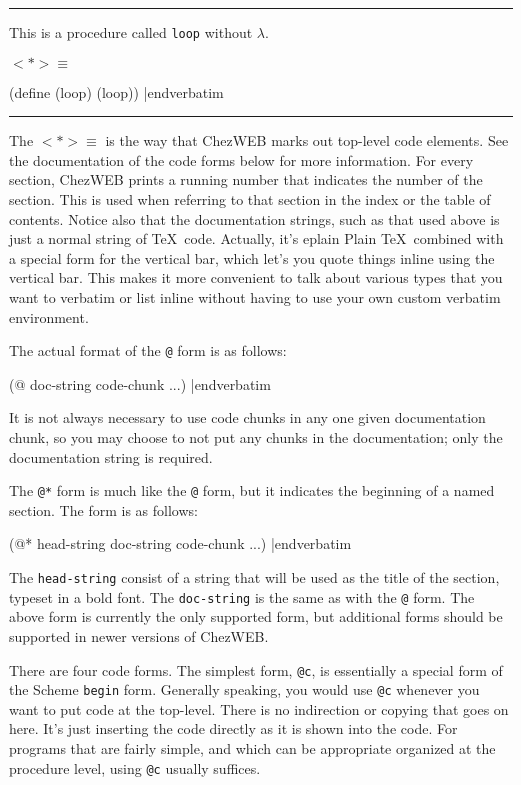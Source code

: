 \bigskip\hrule\smallskip
{\narrower {} This is a procedure called {\tt loop}
without $\lambda$.\par
\noindent $<*>\equiv$\par
\verbatim
(define (loop)
  (loop))
|endverbatim
\smallskip\hrule\bigskip}

\noindent
The $<*>\equiv$ is the way that ChezWEB marks out top-level code
elements.  See the documentation of the code forms below for more
information.  For every section, ChezWEB prints a running number that
indicates the number of the section.  This is used when referring to
that section in the index or the table of contents.  Notice also that
the documentation strings, such as that used above is just a normal
string of \TeX\ code.  Actually, it's eplain Plain \TeX\ combined with
a special form for the vertical bar, which let's you quote things
inline using the vertical bar.  This makes it more convenient to talk
about various types that you want to verbatim or list inline without
having to use your own custom verbatim environment.

The actual format of the {\tt @} form is as follows:

\medskip\verbatim
(@ doc-string code-chunk ...)
|endverbatim
\medskip

\noindent
It is not always necessary to use code chunks in any one given
documentation chunk, so you may choose to not put any chunks in the
documentation; only the documentation string is required.

The {\tt @*} form is much like the {\tt @} form, but it indicates the
beginning of a named section.  The form is as follows:

\medskip\verbatim
(@* head-string doc-string 
  code-chunk ...)
|endverbatim
\medskip

\noindent
The {\tt head-string} consist of a string that will be used as the
title of the section, typeset in a bold font.  The {\tt doc-string} is
the same as with the {\tt @} form.  The above form is currently the
only supported form, but additional forms should be supported in newer
versions of ChezWEB.

%
There are four code forms.  The simplest form, {\tt @c}, is
essentially a special form of the Scheme {\tt begin} form.  Generally
speaking, you would use {\tt @c} whenever you want to put code at the
top-level.  There is no indirection or copying that goes on here.
It's just inserting the code directly as it is shown into the code.
For programs that are fairly simple, and which can be appropriate
organized at the procedure level, using {\tt @c} usually suffices.

